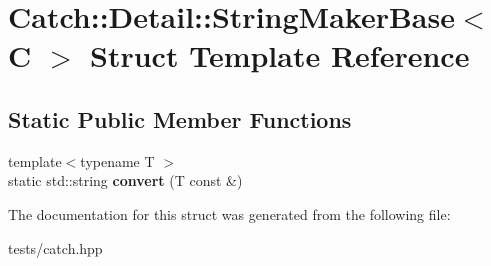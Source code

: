\hypertarget{struct_catch_1_1_detail_1_1_string_maker_base}{}\section{Catch\+:\+:Detail\+:\+:String\+Maker\+Base$<$ C $>$ Struct Template Reference}
\label{struct_catch_1_1_detail_1_1_string_maker_base}
\subsection*{Static Public Member Functions}
\begin{DoxyCompactItemize}
\item 
\mbox{\label{struct_catch_1_1_detail_1_1_string_maker_base_a8eb9f635dc413a5758e22614bafaf1a3}} 
{\footnotesize template$<$typename T $>$ }\\static std\+::string {\bfseries convert} (T const \&)
\end{DoxyCompactItemize}


The documentation for this struct was generated from the following file\+:\begin{DoxyCompactItemize}
\item 
tests/catch.\+hpp\end{DoxyCompactItemize}
